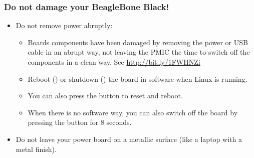 \begin{frame}
\frametitle{Do not damage your BeagleBone Black!}
\begin{itemize}
  \item Do not remove power abruptly:
  \begin{itemize}
     \item Boards components have been damaged by removing the power or
           USB cable in an abrupt way, not leaving the PMIC the time to
           switch off the components in a clean way. See
           \url{http://bit.ly/1FWHNZi}
     \item Reboot () or shutdown () the board
	   in software when Linux is running.
     \item You can also press the  button to reset and
	   reboot.
     \item When there is no software way, you can also switch off
	   the board by pressing the  button for 8 seconds.
  \end{itemize}
  \item Do not leave your power board on a metallic surface (like a
        laptop with a metal finish).
\end{itemize}
\end{frame}
